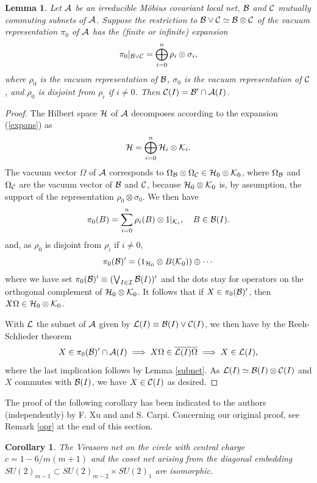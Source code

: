 \documentclass[12pt]{article}
\def\s{{\sigma}}
\def\Om{\Omega}
\newtheorem{lemma}[theorem]{Lemma}
\newtheorem{corollary}[theorem]{Corollary}
\def\A{{\cal A}}
\def\B{{\cal B}}
\def\CC{{\cal C}}
\def\I{{\cal I}}
\def\K{{\cal K}}
\def\L{{\cal L}}
\def\H{{\cal H}}
\begin{document}
\begin{lemma}
\label{lemma-expans}
Let $\A$ be an irreducible M\"{o}bius covariant local net, $\B$ and 
$\CC$ mutually commuting subnets of $\A$. Suppose the restriction to 
$\B\vee\CC\simeq\B\otimes\CC$ of the vacuum representation $\pi_0$ of $\A$ 
has the (finite or infinite) expansion
\begin{equation}\label{expans}
\pi_0 |_{\B\vee\CC} =\bigoplus^n_{i=0} \rho_i\otimes\s_i ,
\end{equation}
where $\rho_0$ is the vacuum representation of $\B$,
$\s_0$ is the vacuum representation of $\CC$, and
$\rho_0$ is disjoint from $\rho_i$ if $i\neq 0$. 
Then $\CC(I)=\B'\cap\A(I)$.
\end{lemma}

\begin{proof}
The Hilbert space $\H$ of $\A$ decomposes according to the expansion 
(\ref{expans}) as
\[
\H =\bigoplus_{i=0}^n \H_i\otimes\K_i.
\]
The vacuum vector $\Om$ of $\A$ corresponds to 
$\Om_\B\otimes\Om_\CC\in\H_0\otimes\K_0$, where $\Om_\B$ and $\Om_\CC$ 
are the vacuum vector of $\B$ and $\CC$, because $\H_0\otimes\K_0$ 
is, by assumption, the support of the representation $\rho_0\otimes\s_0$.
We then have
\[
\pi_0(B) =\sum_{i=0}^n \rho_i(B)\otimes 1|_{\K_i},\quad B\in \B(I).
\]
and, as $\rho_0$ is disjoint from $\rho_i$ if $i\neq 0$, 
\[
\pi_0(\B)' = (1_{\H_0}\otimes B(\K_0)) \oplus \cdots
\]
where we have set $\pi_0(\B)'\equiv(\bigvee_{I\in\I}\B(I))'$ and the 
dots stay for operators on the orthogonal complement of 
$\H_0\otimes\K_0$. 
It follows that if $X\in\pi_0(\B)'$, then $X\Om\in\H_0\otimes\K_0$.

With $\L$ the subnet of $\A$ given by $\L(I)\equiv\B(I)\vee\CC(I)$, 
we then have by the Reeh-Schlieder theorem
\[
X\in\pi_0(\B)'\cap\A(I)\implies X\Om\in 
\overline{\L(I)\Om}\implies X\in \L(I),
\]
where the last implication follows by Lemma \ref{subnet}.
As $\L(I)\simeq \B(I)\otimes\CC(I)$ and $X$ commutes with $\B(I)$, we 
have $X\in\CC(I)$ as desired.
\end{proof} 

The proof of the following corollary has been indicated to the 
authors (independently) by F. Xu and and S. Carpi. 
Concerning our original proof, see Remark \ref{opr}
at the end of this section.

\begin{corollary}
\label{Vir-coset}
The Virasoro net on the circle with central charge
$c=1-6/m(m+1)$ and the coset net arising from the diagonal
embedding $SU(2)_{m-1}\subset SU(2)_{m-2}\times SU(2)_1$
are isomorphic.
\end{corollary}
\end{document}
